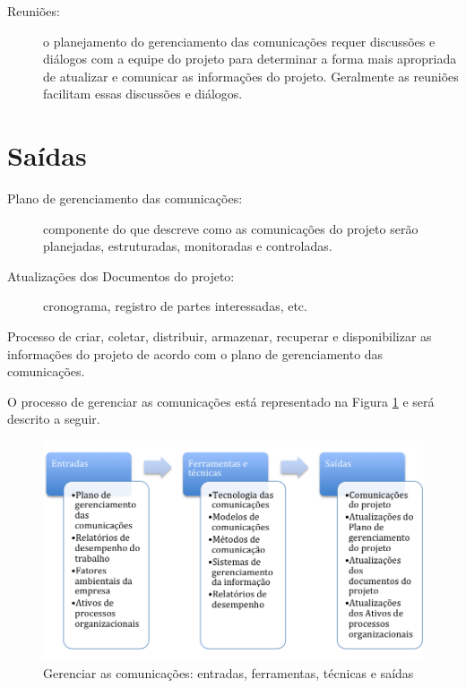 \begin{description}
\begin{description}
		\end{description}	
		
	\item[Reuniões:] o planejamento do gerenciamento das comunicações requer discussões e diálogos com a equipe do projeto para determinar a forma mais apropriada de atualizar e comunicar as informações do projeto. Geralmente as reuniões facilitam essas discussões e diálogos.
	
\end{description}

\section{Saídas}

\begin{description}
	
	\item[Plano de gerenciamento das comunicações:] componente do \planproj que descreve como as comunicações do projeto serão planejadas, estruturadas, monitoradas e controladas.
	
	\item[Atualizações dos Documentos do projeto:] cronograma, registro de partes interessadas, etc.
	
\end{description}


Processo de criar, coletar, distribuir, armazenar, recuperar e disponibilizar as informações do projeto de acordo com o plano de gerenciamento das comunicações.

O processo de gerenciar as comunicações está representado na Figura \ref{fig:comunic:ger:efts} e será descrito a seguir.

\begin{figure}[!h]
	\centering
	\includegraphics[scale=0.5]{Figuras/comunicacoes_efts_gerenciar.png}
	\caption{Gerenciar as comunicações: entradas, ferramentas, técnicas e saídas}
	\label{fig:comunic:ger:efts}
\end{figure}

